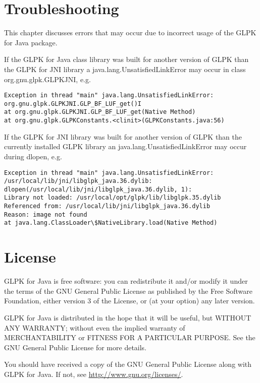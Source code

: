\documentclass[a4paper,11pt]{report}
\begin{document}
\chapter{Troubleshooting}
This chapter discusses errors that may occur due to incorrect usage of
the GLPK for Java package.

If the GLPK for Java class library was built for another version of GLPK
than the GLPK for JNI library a java.lang.UnsatisfiedLinkError may
occur in class org.gnu.glpk.GLPKJNI, e.g.

\begin{verbatim}
Exception in thread "main" java.lang.UnsatisfiedLinkError:
org.gnu.glpk.GLPKJNI.GLP_BF_LUF_get()I
at org.gnu.glpk.GLPKJNI.GLP_BF_LUF_get(Native Method)
at org.gnu.glpk.GLPKConstants.<clinit>(GLPKConstants.java:56) 
\end{verbatim}

If the GLPK for JNI library was built for another version of GLPK than
the currently installed GLPK library an java.lang.UnsatisfiedLinkError
may occur during dlopen, e.g.

\begin{verbatim}
Exception in thread "main" java.lang.UnsatisfiedLinkError:
/usr/local/lib/jni/libglpk_java.36.dylib:
dlopen(/usr/local/lib/jni/libglpk_java.36.dylib, 1):
Library not loaded: /usr/local/opt/glpk/lib/libglpk.35.dylib
Referenced from: /usr/local/lib/jni/libglpk_java.36.dylib
Reason: image not found
at java.lang.ClassLoader\$NativeLibrary.load(Native Method)
\end{verbatim}

\chapter{License}
GLPK for Java is free software: you can redistribute it and/or 
modify it under the terms of the GNU General Public License\cite{GPL} as
published by the Free Software Foundation, either version 3 of the
License, or (at your option) any later version.

GLPK for Java is distributed in the hope that it will be useful, but 
WITHOUT ANY WARRANTY; without even the implied warranty of 
MERCHANTABILITY or FITNESS FOR A PARTICULAR PURPOSE. See the GNU 
General Public License for more details.

You should have received a copy of the GNU General Public License
along with GLPK for Java. If not, see 
\href{http://www.gnu.org/licenses/}{http://www.gnu.org/licenses/}.



\newpage
\printindex
\end{document}
